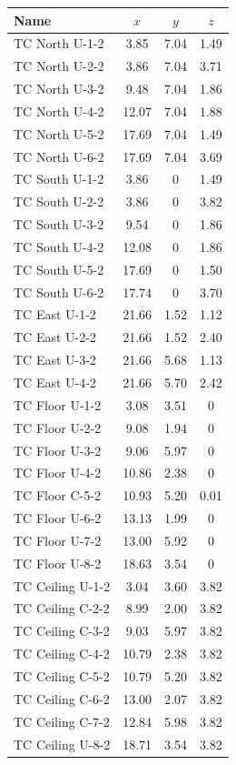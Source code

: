 \begin{figure}[h!]
\begin{center}
\begin{tabular}{|l|c|c|c|}
\hline
Name              & $x$   & $y$  & $z$ \\ \hline \hline
TC North U-1-2    & 3.85  & 7.04 & 1.49 \\ \hline
TC North U-2-2    & 3.86  & 7.04 & 3.71 \\ \hline
TC North U-3-2    & 9.48  & 7.04 & 1.86 \\ \hline
TC North U-4-2    & 12.07 & 7.04 & 1.88 \\ \hline
TC North U-5-2    & 17.69 & 7.04 & 1.49 \\ \hline
TC North U-6-2    & 17.69 & 7.04 & 3.69 \\ \hline
TC South U-1-2    & 3.86  & 0    & 1.49 \\ \hline
TC South U-2-2    & 3.86  & 0    & 3.82 \\ \hline
TC South U-3-2    & 9.54  & 0    & 1.86 \\ \hline
TC South U-4-2    & 12.08 & 0    & 1.86 \\ \hline
TC South U-5-2    & 17.69 & 0    & 1.50 \\ \hline
TC South U-6-2    & 17.74 & 0    & 3.70 \\ \hline
TC East U-1-2     & 21.66 & 1.52 & 1.12 \\ \hline
TC East U-2-2     & 21.66 & 1.52 & 2.40 \\ \hline
TC East U-3-2     & 21.66 & 5.68 & 1.13 \\ \hline
TC East U-4-2     & 21.66 & 5.70 & 2.42 \\ \hline
TC Floor U-1-2    & 3.08  & 3.51 & 0 \\ \hline
TC Floor U-2-2    & 9.08  & 1.94 & 0 \\ \hline
TC Floor U-3-2    & 9.06  & 5.97 & 0 \\ \hline
TC Floor U-4-2    & 10.86 & 2.38 & 0 \\ \hline
TC Floor C-5-2    & 10.93 & 5.20 & 0.01 \\ \hline
TC Floor U-6-2    & 13.13 & 1.99 & 0 \\ \hline
TC Floor U-7-2    & 13.00 & 5.92 & 0 \\ \hline
TC Floor U-8-2    & 18.63 & 3.54 & 0 \\ \hline
TC Ceiling U-1-2  & 3.04  & 3.60 & 3.82 \\ \hline
TC Ceiling C-2-2  & 8.99  & 2.00 & 3.82 \\ \hline
TC Ceiling C-3-2  & 9.03  & 5.97 & 3.82 \\ \hline
TC Ceiling C-4-2  & 10.79 & 2.38 & 3.82 \\ \hline
TC Ceiling C-5-2  & 10.79 & 5.20 & 3.82 \\ \hline
TC Ceiling C-6-2  & 13.00 & 2.07 & 3.82 \\ \hline
TC Ceiling C-7-2  & 12.84 & 5.98 & 3.82 \\ \hline
TC Ceiling U-8-2  & 18.71 & 3.54 & 3.82 \\ \hline
\end{tabular}
\end{center}
\end{figure}

